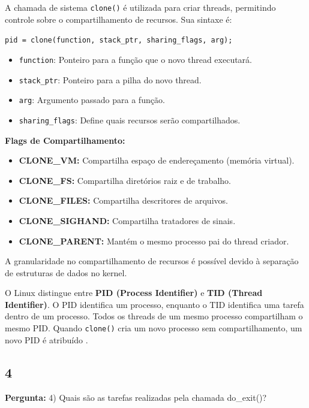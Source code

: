 \documentclass{article}
\begin{document}
A chamada de sistema \texttt{clone()} é utilizada para criar threads, permitindo controle sobre o compartilhamento de recursos. Sua sintaxe é:
\begin{center}
    \texttt{pid = clone(function, stack\_ptr, sharing\_flags, arg);}
\end{center}
\begin{itemize}
    \item \texttt{function}: Ponteiro para a função que o novo thread executará.
    \item \texttt{stack\_ptr}: Ponteiro para a pilha do novo thread.
    \item \texttt{arg}: Argumento passado para a função.
    \item \texttt{sharing\_flags}: Define quais recursos serão compartilhados.
\end{itemize}

\textbf{Flags de Compartilhamento:}
\begin{itemize}
    \item \textbf{CLONE\_VM:} Compartilha espaço de endereçamento (memória virtual).
    \item \textbf{CLONE\_FS:} Compartilha diretórios raiz e de trabalho.
    \item \textbf{CLONE\_FILES:} Compartilha descritores de arquivos.
    \item \textbf{CLONE\_SIGHAND:} Compartilha tratadores de sinais.
    \item \textbf{CLONE\_PARENT:} Mantém o mesmo processo pai do thread criador.
\end{itemize}

A granularidade no compartilhamento de recursos é possível devido à separação de estruturas de dados no kernel.

O Linux distingue entre \textbf{PID (Process Identifier)} e \textbf{TID (Thread Identifier)}. O PID identifica um processo, enquanto o TID identifica uma tarefa dentro de um processo. Todos os threads de um mesmo processo compartilham o mesmo PID. Quando \texttt{clone()} cria um novo processo sem compartilhamento, um novo PID é atribuído \parencite[p. 515]{tanenbaum2021}.


\subsection{4}

\textbf{Pergunta:} 4) Quais são as tarefas realizadas pela chamada do\_exit()?\newline
\end{document}
